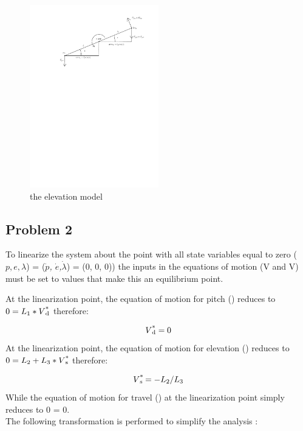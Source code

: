 \begin{figure}[H]
  \caption{the elevation model}
  \label{fig:elevation_model}
  \includegraphics[width=0.5\textwidth]{images/elevation_model}
\end{figure}

\subsection{Problem 2}
To linearize the system about the point with all state variables equal
to zero ($p, e, \lambda$) = (\textit{$\dot{p}$,
  $\dot{e}$,$\dot{\lambda}$}) = (0, 0, 0))  the inputs in the
equations of motion (V and V) must be set to
values that make this an equilibrium point.

At the linearization point, the equation of motion for pitch
() reduces to $0 = L\SB{1} *
V\SPSB{*}{d}$ therefore:

\begin{equation}
  V\SPSB{*}{d} = 0
\end{equation}
At the linearization point, the equation of motion for elevation
() reduces to $0 = L\SB{2} +
L\SB{3}*V\SPSB{*}{s}$ therefore:

\begin{equation}
  V\SPSB{*}{s} = -L\SB{2} / L\SB{3}
\end{equation}
While the equation of motion for travel () at the linearization point simply reduces to 0 = 0.\\
The following transformation is performed to simplify the analysis
:

